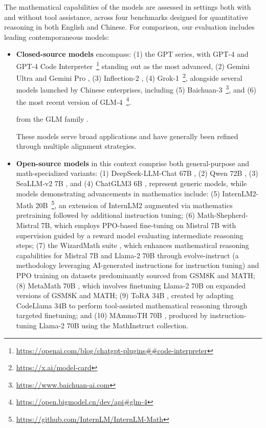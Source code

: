 \begin{itemize}[topsep=0pt]
The mathematical capabilities of the models are assessed in settings both with and without tool assistance, across four benchmarks designed for quantitative reasoning in both English and Chinese. For comparison, our evaluation includes leading contemporaneous models:

\begin{itemize}[topsep=0pt]
    \item \textbf{Closed-source models} encompass: (1) the GPT series, with GPT-4 \citep{gpt4} and GPT-4 Code Interpreter~\footnote{\url{https://openai.com/blog/chatgpt-plugins\#\#code-interpreter}} standing out as the most advanced, (2) Gemini Ultra and Gemini Pro \citep{gemini}, (3) Inflection-2 \citep{inflection-2}, (4) Grok-1~\footnote{\url{https://x.ai/model-card}}, alongside several models launched by Chinese enterprises, including (5) Baichuan-3~\footnote{\url{https://www.baichuan-ai.com}}, and (6) the most recent version of GLM-4~\footnote{\url{https://open.bigmodel.cn/dev/api\#glm-4}}.

    from the GLM family \citep{glm}.

These models serve broad applications and have generally been refined through multiple alignment strategies.

\item \textbf{Open-source models} in this context comprise both general-purpose and math-specialized variants: (1) DeepSeek-LLM-Chat 67B \citep{deepseek-llm}, (2) Qwen 72B \citep{qwen}, (3) SeaLLM-v2 7B \citep{seallm}, and (4) ChatGLM3 6B \citep{chatglm3}, represent generic models, while models demonstrating advancements in mathematics include: (5) InternLM2-Math 20B~\footnote{\url{https://github.com/InternLM/InternLM-Math}}, an extension of InternLM2 augmented via mathematics pretraining followed by additional instruction tuning; (6) Math-Shepherd-Mistral 7B, which employs PPO-based fine-tuning \citep{schulman2017proximal} on Mistral 7B \citep{mistral} with supervision guided by a reward model evaluating intermediate reasoning steps; (7) the WizardMath suite \citep{wizardmath}, which enhances mathematical reasoning capabilities for Mistral 7B and Llama-2 70B \citep{llama2} through evolve-instruct (a methodology leveraging AI-generated instructions for instruction tuning) and PPO training on datasets predominantly sourced from GSM8K and MATH; (8) MetaMath 70B \citep{metamath}, which involves finetuning Llama-2 70B on expanded versions of GSM8K and MATH; (9) ToRA 34B \cite{tora}, created by adapting CodeLlama 34B to perform tool-assisted mathematical reasoning through targeted finetuning; and (10) MAmmoTH 70B \citep{MathInstruct}, produced by instruction-tuning Llama-2 70B using the MathInstruct collection.


\end{itemize}
\end{itemize}
